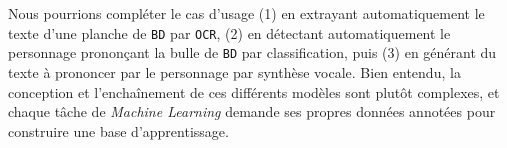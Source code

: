 			\begin{leftBarInformation}
				Nous pourrions compléter le cas d'usage
				(1) en extrayant automatiquement le texte d'une planche de \texttt{BD} par \texttt{OCR},
				(2) en détectant automatiquement le personnage prononçant la bulle de \texttt{BD} par classification,
				puis (3) en générant du texte à prononcer par le personnage par synthèse vocale.
				Bien entendu, la conception et l’enchaînement de ces différents modèles sont plutôt complexes, et chaque tâche de \textit{Machine Learning} demande ses propres données annotées pour construire une base d'apprentissage.
			\end{leftBarInformation}
			
			
		
